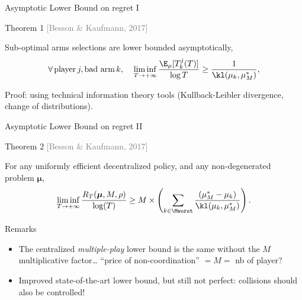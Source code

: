 \documentclass[12pt,english,ignorenonframetext,aspectratio=169,]{beamer}
\providecommand{\tightlist}{%
  \setlength{\itemsep}{0pt}\setlength{\parskip}{0pt}}
\begin{document}
\begin{frame}{Asymptotic Lower Bound on regret I}

\begin{block}{Theorem 1
  \hfill{}\textcolor{gray}{[Besson \& Kaufmann, 2017]}}

  Sub-optimal arms selections are lower bounded asymptotically,
  \[\forall\, \text{player}\, j, \text{bad arm}\,k,\;\;\;\; \mathop{\lim\inf}\limits_{T \to +\infty} \frac{\E_{\mu}[T_k^j(T)]}{\log T} \geq \frac{1}{\kl(\mu_k, \mu_M^*)},\]

\end{block}

Proof: using technical information theory tools (Kullback-Leibler divergence, change of distributions).

\end{frame}

\begin{frame}{Asymptotic Lower Bound on regret II}

\begin{block}{Theorem 2
\hfill{}\textcolor{gray}{[Besson \& Kaufmann, 2017]}}

\small{For any uniformly efficient decentralized policy, and any
non-degenerated problem \(\boldsymbol{\mu}\),} \vspace*{-10pt}
\[ \mathop{\lim\inf}\limits_{T \to +\infty} \frac{R_T(\boldsymbol{\mu}, M, \rho)}{\log(T)} \geq M \times \left( \sum_{k \in \Mworst} \frac{(\mu_M^* -  \mu_k)}{\kl(\mu_k, \mu_M^*)} \right) . \]
\end{block}

\pause

\begin{block}{Remarks}

\begin{itemize}
\tightlist
\item
  The centralized \emph{multiple-play} lower bound is the same without
  the \(M\) multiplicative factor\ldots{}
  \hook \alert{``price of non-coordination''} \(= M =\) nb of player?
\item
  Improved state-of-the-art lower bound, but still not perfect:
  collisions should also be controlled!
\end{itemize}

\end{block}

\end{frame}
\end{document}
